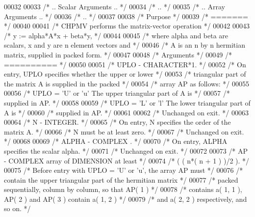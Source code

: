 \begin{DoxyCode}
00032 
00033 \textcolor{comment}{/*     .. Scalar Arguments .. */}
00034 \textcolor{comment}{/*     .. */}
00035 \textcolor{comment}{/*     .. Array Arguments .. */}
00036 \textcolor{comment}{/*     .. */}
00037 
00038 \textcolor{comment}{/*  Purpose */}
00039 \textcolor{comment}{/*  ======= */}
00040 
00041 \textcolor{comment}{/*  CHPMV  performs the matrix-vector operation */}
00042 
00043 \textcolor{comment}{/*     y := alpha*A*x + beta*y, */}
00044 
00045 \textcolor{comment}{/*  where alpha and beta are scalars, x and y are n element vectors and */}
00046 \textcolor{comment}{/*  A is an n by n hermitian matrix, supplied in packed form. */}
00047 
00048 \textcolor{comment}{/*  Arguments */}
00049 \textcolor{comment}{/*  ========== */}
00050 
00051 \textcolor{comment}{/*  UPLO   - CHARACTER*1. */}
00052 \textcolor{comment}{/*           On entry, UPLO specifies whether the upper or lower */}
00053 \textcolor{comment}{/*           triangular part of the matrix A is supplied in the packed */}
00054 \textcolor{comment}{/*           array AP as follows: */}
00055 
00056 \textcolor{comment}{/*              UPLO = 'U' or 'u'   The upper triangular part of A is */}
00057 \textcolor{comment}{/*                                  supplied in AP. */}
00058 
00059 \textcolor{comment}{/*              UPLO = 'L' or 'l'   The lower triangular part of A is */}
00060 \textcolor{comment}{/*                                  supplied in AP. */}
00061 
00062 \textcolor{comment}{/*           Unchanged on exit. */}
00063 
00064 \textcolor{comment}{/*  N      - INTEGER. */}
00065 \textcolor{comment}{/*           On entry, N specifies the order of the matrix A. */}
00066 \textcolor{comment}{/*           N must be at least zero. */}
00067 \textcolor{comment}{/*           Unchanged on exit. */}
00068 
00069 \textcolor{comment}{/*  ALPHA  - COMPLEX         . */}
00070 \textcolor{comment}{/*           On entry, ALPHA specifies the scalar alpha. */}
00071 \textcolor{comment}{/*           Unchanged on exit. */}
00072 
00073 \textcolor{comment}{/*  AP     - COMPLEX          array of DIMENSION at least */}
00074 \textcolor{comment}{/*           ( ( n*( n + 1 ) )/2 ). */}
00075 \textcolor{comment}{/*           Before entry with UPLO = 'U' or 'u', the array AP must */}
00076 \textcolor{comment}{/*           contain the upper triangular part of the hermitian matrix */}
00077 \textcolor{comment}{/*           packed sequentially, column by column, so that AP( 1 ) */}
00078 \textcolor{comment}{/*           contains a( 1, 1 ), AP( 2 ) and AP( 3 ) contain a( 1, 2 ) */}
00079 \textcolor{comment}{/*           and a( 2, 2 ) respectively, and so on. */}

\end{DoxyCode}

